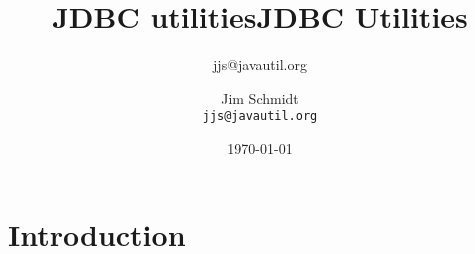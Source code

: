 \documentclass[a4paper,10pt]{book}
\title{JDBC utilities}
\author{jjs@javautil.org}
\begin{document}
\title{JDBC Utilities}
\author{Jim Schmidt\\
  \texttt{jjs@javautil.org}}
\date{\today}
\maketitle
\tableofcontents
\chapter{Introduction}
\end{document}
